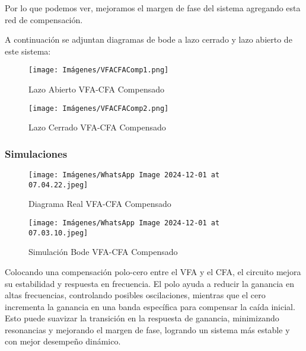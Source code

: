     \begin{center}
    \end{center}

    Por lo que podemos ver, mejoramos el margen de fase del sistema agregando esta red de compensación.

    A continuación se adjuntan diagramas de bode a lazo cerrado y lazo abierto de este sistema:

    \begin{figure}[h]
        \centering
        \texttt{[image: Imágenes/VFACFAComp1.png]}
        \caption{Lazo Abierto VFA-CFA Compensado}
    \end{figure}
    
    \begin{figure}[h]
        \centering
        \texttt{[image: Imágenes/VFACFAComp2.png]}
        \caption{Lazo Cerrado VFA-CFA Compensado}
    \end{figure}


    \newpage
    \subsubsection{Simulaciones}
    \begin{figure}[H]
    \centering
    \begin{minipage}{0.48\textwidth}
        \centering
        \texttt{[image: Imágenes/WhatsApp Image 2024-12-01 at 07.04.22.jpeg]}
        \caption{Diagrama Real VFA-CFA Compensado}
        \label{fig:diagrama_vos}
    \end{minipage}
    \hfill
    \begin{minipage}{0.48\textwidth}
        \centering
        \texttt{[image: Imágenes/WhatsApp Image 2024-12-01 at 07.03.10.jpeg]}
        \caption{Simulación Bode VFA-CFA Compensado}
        \label{fig:simu_vos}
    \end{minipage}
\end{figure}
Colocando una compensación polo-cero entre el VFA y el CFA, el circuito mejora su estabilidad y respuesta en frecuencia. El polo ayuda a reducir la ganancia en altas frecuencias, controlando posibles oscilaciones, mientras que el cero incrementa la ganancia en una banda específica para compensar la caída inicial. Esto puede suavizar la transición en la respuesta de ganancia, minimizando resonancias y mejorando el margen de fase, logrando un sistema más estable y con mejor desempeño dinámico.